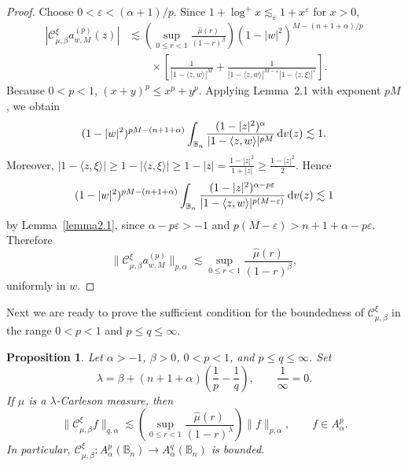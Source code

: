 \documentclass[preprint,12pt,times]{elsarticle}
\newtheorem{proposition}[theorem]{Proposition}
\theoremstyle{definition}
\theoremstyle{remark}
\numberwithin{equation}{section}
\begin{document}
\begin{proof}
Choose \(0<\varepsilon<(\alpha+1)/p\). Since
\(1+\log^+x\lesssim_\varepsilon1+x^\varepsilon\) for \(x>0\),
\[
\begin{aligned}
  |\mathcal C_{\mu,\beta}^{\xi}a_{w,M}^{(p)}(z)|
  &\lesssim
  \left(\sup_{0\le r<1}\frac{\widehat\mu(r)}{(1-r)^\beta}\right)
  (1-|w|^2)^{M-(n+1+\alpha)/p}\\
  &\qquad\times
  \left[
    \frac{1}{|1-\langle z,w\rangle|^M}
    +\frac{1}{|1-\langle z,w\rangle|^{M-\varepsilon}
             |1-\langle z,\xi\rangle|^\varepsilon}
  \right].
\end{aligned}
\]
Because \(0<p<1\), \((x+y)^p\le x^p+y^p\). 
Applying Lemma~2.1 with exponent $pM$, we obtain
\[
  (1-|w|^2)^{pM-(n+1+\alpha)}
  \int_{\mathbb B_n}
  \frac{(1-|z|^2)^\alpha}{|1-\langle z,w\rangle|^{pM}}\,{\rm d}v(z)
  \lesssim1.
\]
Moreover, \(|1-\langle z,\xi\rangle|\ge 1-|\langle z,\xi\rangle|\ge 1-|z|=\frac{1-|z|^2}{1+|z|}\ge\frac{1-|z|^2}{2}\). Hence
\[
  (1-|w|^2)^{pM-(n+1+\alpha)}
  \int_{\mathbb B_n}
  \frac{(1-|z|^2)^{\alpha-p\varepsilon}}{|1-\langle z,w\rangle|^{p(M-\varepsilon)}}\,{\rm d}v(z)
  \lesssim1
\]
by Lemma~\ref{lemma2.1}, since
\(\alpha-p\varepsilon>-1\) and
\(p(M-\varepsilon)>n+1+\alpha-p\varepsilon\). Therefore
\[
  \|\mathcal C_{\mu,\beta}^{\xi}a_{w,M}^{(p)}\|_{p,\alpha}
  \lesssim
  \sup_{0\le r<1}\frac{\widehat\mu(r)}{(1-r)^\beta},
\]
uniformly in \(w\).
\end{proof}

Next we are ready to prove the
sufficient condition for the boundedness of $\mathcal C_{\mu,\beta}^{\xi}$ in the range $0<p<1$ and $p\le q\le\infty$.


\begin{proposition}\label{proposition3.5}
Let \(\alpha>-1\), \(\beta>0\), \(0<p<1\), and \(p\le q\le\infty\). Set
\[
    \lambda=\beta+(n+1+\alpha)\left(\frac{1}p-\frac{1}q\right),
    \qquad \frac{1}{\infty}=0.
\]
If \(\mu\) is a \(\lambda\)-Carleson measure, then
\[
  \|\mathcal C_{\mu,\beta}^{\xi}f\|_{q,\alpha}
  \lesssim
  \left(
    \sup_{0\le r<1}
    \frac{\widehat\mu(r)}{(1-r)^\lambda}
  \right)
  \|f\|_{p,\alpha},
  \qquad f\in A_\alpha^p.
\]
In particular,
\(\mathcal C_{\mu,\beta}^{\xi}:A_\alpha^p(\mathbb B_n)\to
A_\alpha^q(\mathbb B_n)\) is bounded.
\end{proposition}
\end{document}
